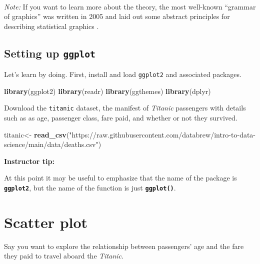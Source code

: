 \documentclass[]{book}
\newenvironment{Shaded}{\begin{snugshade}}{\end{snugshade}}
\newcommand{\KeywordTok}[1]{\textcolor[rgb]{0.13,0.29,0.53}{\textbf{#1}}}
\newcommand{\NormalTok}[1]{#1}
\newcommand{\StringTok}[1]{\textcolor[rgb]{0.31,0.60,0.02}{#1}}
\begin{document}
~

\emph{Note:} If you want to learn more about the theory, the most well-known ``grammar of graphics'' was written in 2005 and laid out some abstract principles for describing statistical graphics \citep{10.5555/1088896}.

\hypertarget{setting-up-ggplot}{%
\subsection*{\texorpdfstring{Setting up \texttt{ggplot}}{Setting up ggplot}}\label{setting-up-ggplot}}

Let's learn by doing. First, install and load \texttt{ggplot2} and associated packages.

\begin{Shaded}
\begin{Highlighting}[]
\KeywordTok{library}\NormalTok{(ggplot2)}
\KeywordTok{library}\NormalTok{(readr)}
\KeywordTok{library}\NormalTok{(ggthemes)}
\KeywordTok{library}\NormalTok{(dplyr)}
\end{Highlighting}
\end{Shaded}

Download the \texttt{titanic} dataset, the manifest of \emph{Titanic} passengers with details such as as age, passenger class, fare paid, and whether or not they survived.

\begin{Shaded}
\begin{Highlighting}[]
\NormalTok{titanic<-}\StringTok{ }\KeywordTok{read_csv}\NormalTok{(}\StringTok{"https://raw.githubusercontent.com/databrew/intro-to-data-science/main/data/deaths.csv"}\NormalTok{)}
\end{Highlighting}
\end{Shaded}

\leavevmode\hypertarget{tip-text}{}%
\textbf{Instructor tip:}

At this point it may be useful to emphasize that the name of the package is \textbf{\texttt{ggplot2}}, but the name of the function is just \textbf{\texttt{ggplot()}}.

\hypertarget{scatter-plot}{%
\section*{Scatter plot}\label{scatter-plot}}

Say you want to explore the relationship between passengers' age and the fare they paid to travel aboard the \emph{Titanic}.
\end{document}
